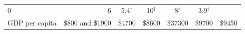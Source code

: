 \documentclass[11pt,a4paper,openany]{book}
\begin{document}
\begin{longtable}[]{@{}lrccccc@{}}
\begin{minipage}[t]{0.11\columnwidth}
0\strut
\end{minipage} & \begin{minipage}[t]{0.23\columnwidth}\centering\strut
6\strut
\end{minipage} & \begin{minipage}[t]{0.09\columnwidth}\centering\strut
5.4\(^{\dagger}\)\strut
\end{minipage} & \begin{minipage}[t]{0.09\columnwidth}\centering\strut
10\(^{\dagger}\)\strut
\end{minipage} & \begin{minipage}[t]{0.08\columnwidth}\centering\strut
8\(^{\dagger}\)\strut
\end{minipage} & \begin{minipage}[t]{0.09\columnwidth}\centering\strut
3.9\(^{\dagger}\)\strut
\end{minipage}\tabularnewline
\begin{minipage}[t]{0.12\columnwidth}\raggedright\strut
GDP per capita\strut
\end{minipage} & \begin{minipage}[t]{0.11\columnwidth}\raggedleft\strut
\$800 and \$1900\strut
\end{minipage} & \begin{minipage}[t]{0.23\columnwidth}\centering\strut
\$4700\strut
\end{minipage} & \begin{minipage}[t]{0.09\columnwidth}\centering\strut
\$8600\strut
\end{minipage} & \begin{minipage}[t]{0.09\columnwidth}\centering\strut
\$37300\strut
\end{minipage} & \begin{minipage}[t]{0.08\columnwidth}\centering\strut
\$9700\strut
\end{minipage} & \begin{minipage}[t]{0.09\columnwidth}\centering\strut
\$9450\strut
\end{minipage}\tabularnewline
\bottomrule
\end{longtable}
\end{document}
